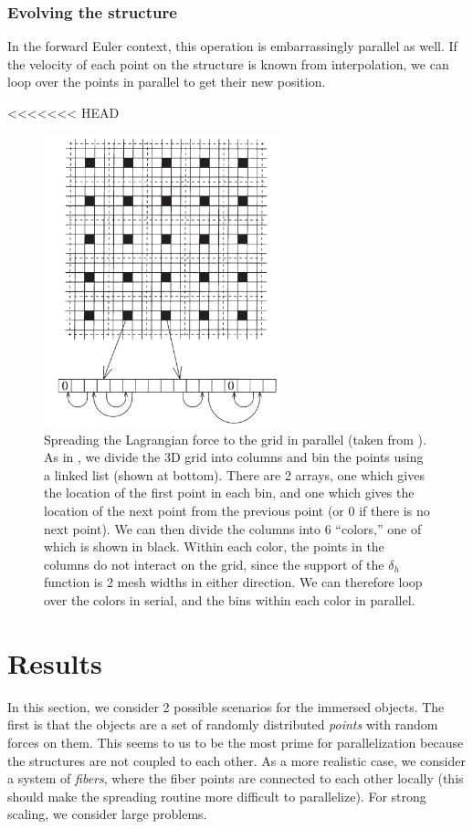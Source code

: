 \documentclass[]{article}
\begin{document}
\subsubsection{Evolving the structure}
In the forward Euler context, this operation is embarrassingly parallel as well. If the velocity of each point on the structure is known from interpolation, we can loop over the points in parallel to get their new position. 

<<<<<<< HEAD
\begin{figure}
\centering     
\includegraphics[width=70mm]{PeskinMcQueen.png}
\caption{Spreading the Lagrangian force to the grid in parallel (taken from \cite{mcqueen}). As in \cite{mcqueen}, we divide the 3D grid into columns and bin the points using a linked list (shown at bottom). There are 2 arrays, one which gives the location of the first point in each bin, and one which gives the location of the next point from the previous point (or 0 if there is no next point). We can then divide the columns into 6 ``colors,'' one of which is shown in black. Within each color, the points in the columns do not interact on the grid, since the support of the $\delta_h$ function is 2 mesh widths in either direction. We can therefore loop over the colors in serial, and the bins within each color in parallel. }
\label{fig:parspread}
\end{figure}


\section{Results}
In this section, we consider 2 possible scenarios for the immersed objects. The first is that the objects are a set of randomly distributed \textit{points} with random forces on them. This seems to us to be the most prime for parallelization because the structures are not coupled to each other. As a more realistic case, we consider a system of \textit{fibers}, where the fiber points are connected to each other locally (this should make the spreading routine more difficult to parallelize). For strong scaling, we consider large problems.
\end{document}

